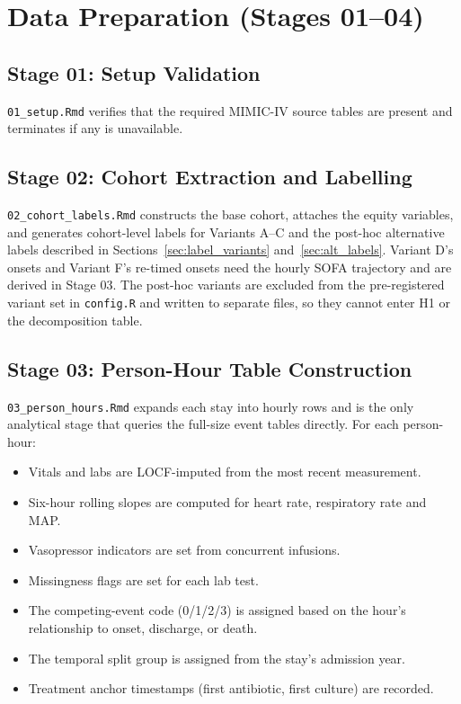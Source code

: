 \section{Data Preparation (Stages 01--04)}

\subsection{Stage 01: Setup Validation}

\texttt{01\_setup.Rmd} verifies that the required MIMIC-IV source tables are
present and terminates if any is unavailable.

\subsection{Stage 02: Cohort Extraction and Labelling}

\texttt{02\_cohort\_labels.Rmd} constructs the base cohort, attaches the equity
variables, and generates cohort-level labels for Variants A--C and the
post-hoc alternative labels described in Sections~\ref{sec:label_variants}
and~\ref{sec:alt_labels}. Variant D's onsets and Variant F's re-timed onsets
need the hourly SOFA trajectory and are derived in Stage 03. The post-hoc
variants are excluded from the pre-registered variant set in \texttt{config.R}
and written to separate files, so they cannot enter H1 or the decomposition
table.

\subsection{Stage 03: Person-Hour Table Construction}

\texttt{03\_person\_hours.Rmd} expands each stay into hourly rows and is the
only analytical stage that queries the full-size event tables directly. For
each person-hour:

\begin{itemize}
    \item Vitals and labs are LOCF-imputed from the most recent measurement.
    \item Six-hour rolling slopes are computed for heart rate, respiratory
    rate and MAP.
    \item Vasopressor indicators are set from concurrent infusions.
    \item Missingness flags are set for each lab test.
    \item The competing-event code (0/1/2/3) is assigned based on the hour's
    relationship to onset, discharge, or death.
    \item The temporal split group is assigned from the stay's admission year.
    \item Treatment anchor timestamps (first antibiotic, first culture) are
    recorded.
\end{itemize}

